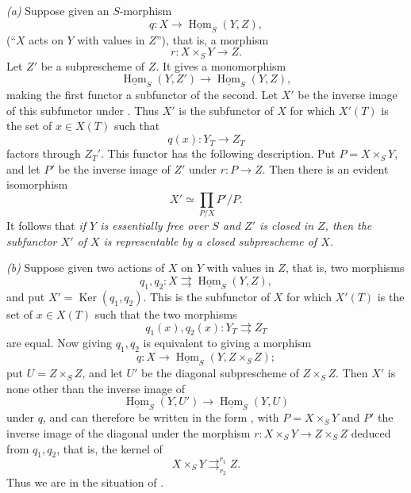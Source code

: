 \smallskip
\noindent{}\textit{(a)}
Suppose given an \(S\)-morphism
\[
  q:X\longrightarrow\underline{\operatorname{Hom}}_S(Y,Z),
  \tag{x}\label{sga3:viii:examples:6:5:eq:x:01}
\]
(``\(X\) acts on \(Y\) with values in \(Z\)''), that is, a morphism
\[
  r:X\times_SY\longrightarrow Z.
  \tag{xx}\label{sga3:viii:examples:6:5:eq:xx:01}
\]
Let \(Z'\) be a subprescheme of \(Z\). It gives a monomorphism
\[
  \underline{\operatorname{Hom}}_S(Y,Z')
  \longrightarrow
  \underline{\operatorname{Hom}}_S(Y,Z),
\]
making the first functor a subfunctor of the second. Let \(X'\) be the
inverse image of this subfunctor under
. Thus \(X'\) is the
subfunctor of \(X\) for which \(X'(T)\) is the set of \(x\in X(T)\)
such that
\[
  q(x):Y_T\longrightarrow Z_T
\]
factors through \(Z_T'\). This functor has the following description.
Put \(P=X\times_SY\), and let \(P'\) be the inverse image of \(Z'\)
under \(r:P\to Z\). Then there is an evident isomorphism
\[
  X'\simeq\prod_{P/X}P'/P.
  \tag{xxx}\label{sga3:viii:examples:6:5:eq:xxx:01}
\]
It follows that \textit{if \(Y\) is essentially free over \(S\) and
\(Z'\) is closed in \(Z\), then the subfunctor \(X'\) of \(X\) is
representable by a closed subprescheme of \(X\).}

\smallskip
\noindent{}\textit{(b)}
Suppose given two actions of \(X\) on \(Y\) with values in \(Z\), that
is, two morphisms
\[
  q_1,q_2:X\rightrightarrows
  \underline{\operatorname{Hom}}_S(Y,Z),
\]
and put \(X'=\operatorname{Ker}(q_1,q_2)\). This is the subfunctor of
\(X\) for which \(X'(T)\) is the set of \(x\in X(T)\) such that the two
morphisms
\[
  q_1(x),q_2(x):Y_T\rightrightarrows Z_T
\]
are equal. Now giving \(q_1,q_2\) is equivalent to giving a morphism
\[
  q:X\longrightarrow
  \underline{\operatorname{Hom}}_S(Y,Z\times_SZ);
\]
put \(U=Z\times_SZ\), and let \(U'\) be the diagonal subprescheme of
\(Z\times_SZ\). Then \(X'\) is none other than the inverse image of
\[
  \underline{\operatorname{Hom}}_S(Y,U')
  \longrightarrow
  \underline{\operatorname{Hom}}_S(Y,U)
\]
under \(q\), and can therefore be written in the form
, with
\(P=X\times_SY\) and \(P'\) the inverse image of the diagonal under the
morphism \(r:X\times_SY\to Z\times_SZ\) deduced from \(q_1,q_2\), that is,
the kernel of
\[
  X\times_SY
  \mathop{\rightrightarrows}^{r_1}_{r_2}
  Z.
\]
Thus we are in the situation of .

